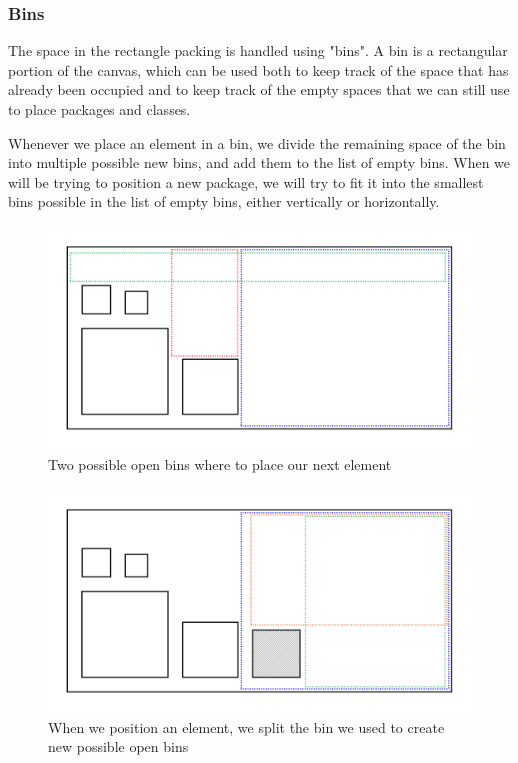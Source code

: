 \documentclass[]{usiinfbachelorproject}
\begin{document}
\subsubsection{Bins} \label{Bins}
The space in the rectangle packing is handled using "bins". A bin is a rectangular portion of the canvas, which can be used both to keep track of the space that has already been occupied and to keep track of the empty spaces that we can still use to place packages and classes.

Whenever we place an element in a bin, we divide the remaining space of the bin into multiple possible new bins, and add them to the list of empty bins. When we will be trying to position a new package, we will try to fit it into the smallest bins possible in the list of empty bins, either vertically or horizontally.

\begin{figure} [H]
\centering
\includegraphics[width=.7\textwidth]{pictures/bins.png}
\caption{Two possible open bins where to place our next element}
\label{fig:bins}
\end{figure}

\begin{figure} [H]
\centering
\includegraphics[width=.7\textwidth]{pictures/binsPlacing.png}
\caption{When we position an element, we split the bin we used to create new possible open bins}
\label{fig:binsPlacing}
\end{figure}
\end{document}
